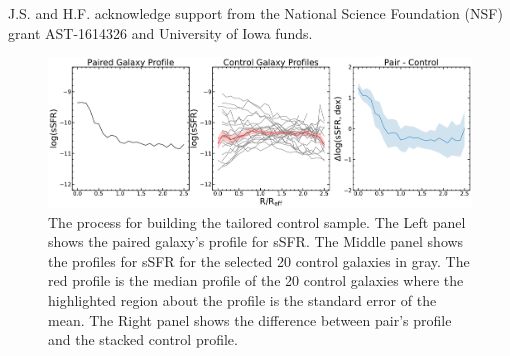 \documentclass[iop,revtex4,twocolumn,apj,numberedappendix,appendixfloats]{emulateapj}
\begin{document}
\acknowledgments

J.S. and H.F. acknowledge support from the National Science Foundation (NSF) grant AST-1614326 and University of Iowa funds. 








\begin{figure}
\centering
\includegraphics[width=\linewidth]{fig/8083-12703.pdf}
\caption[Example of the difference profiles for the mass-redshift selected control sample.]{The process for building the tailored control sample. The Left panel shows the paired galaxy's profile for sSFR. The Middle panel shows the profiles for sSFR for the selected 20 control galaxies in gray. The red profile is the median profile of the 20 control galaxies where the highlighted region about the profile is the standard error of the mean. The Right panel shows the difference between pair's profile and the stacked control profile.}
\label{fig:dex}
\end{figure}
\end{document}
